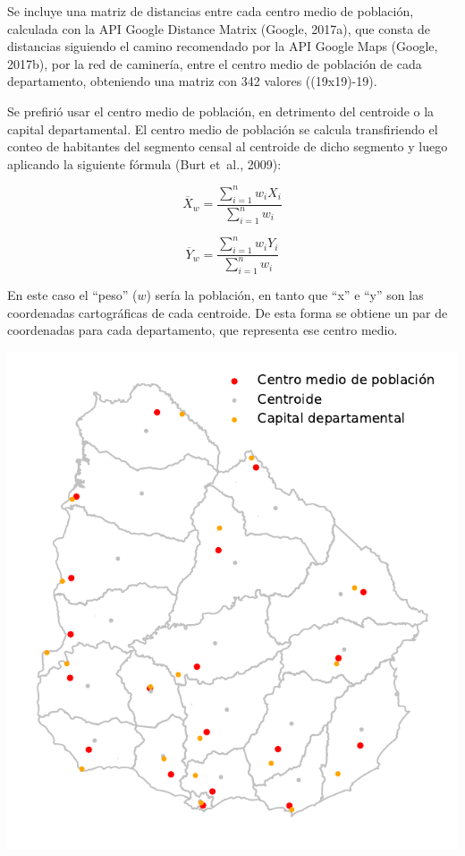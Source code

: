 \documentclass[12pt,spanish,]{article}
\let\origfigure\figure
\let\endorigfigure\endfigure
\renewenvironment{figure}[1][2] {
    \expandafter\origfigure\expandafter[H]
} {
    \endorigfigure
}
\begin{document}
Se incluye una matriz de distancias entre cada centro medio de
población, calculada con la API Google Distance Matrix (Google, 2017a),
que consta de distancias siguiendo el camino recomendado por la API
Google Maps (Google, 2017b), por la red de caminería, entre el centro
medio de población de cada departamento, obteniendo una matriz con 342
valores ((19x19)-19).

Se prefirió usar el centro medio de población, en detrimento del
centroide o la capital departamental. El centro medio de población se
calcula transfiriendo el conteo de habitantes del segmento censal al
centroide de dicho segmento y luego aplicando la siguiente fórmula (Burt
et~al., 2009):

\[
\overline{X}_w=\frac{\sum_{i=1}^{n}w_{i}X_{i}}{\sum_{i=1}^{n} w_{i}}
\]

\[
\overline{Y}_w=\frac{\sum_{i=1}^{n}w_{i}Y_{i}}{\sum_{i=1}^{n} w_{i}}
\]

En este caso el ``peso'' (\(w\)) sería la población, en tanto que ``x''
e ``y'' son las coordenadas cartográficas de cada centroide. De esta
forma se obtiene un par de coordenadas para cada departamento, que
representa ese centro medio.

\begin{figure}
\centering
\includegraphics{./tex2pdf.-8c1f0593c1a83dbe/1e1ebe914247a06bc0fb87bbc6d2d9c0f8ecab24.pdf}
\caption{Mapa de centroides, capitales departamentales y centro medio de
población calculado según las fórmulas mencionadas.}
\end{figure}
\end{document}
